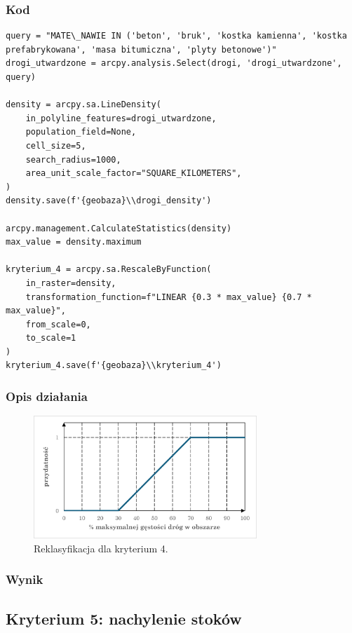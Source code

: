 \documentclass{article}
\begin{document}
\subsubsection{Kod}
\begin{lstlisting}
query = "MATE\_NAWIE IN ('beton', 'bruk', 'kostka kamienna', 'kostka prefabrykowana', 'masa bitumiczna', 'plyty betonowe')"
drogi_utwardzone = arcpy.analysis.Select(drogi, 'drogi_utwardzone', query)

density = arcpy.sa.LineDensity(
    in_polyline_features=drogi_utwardzone,
    population_field=None,
    cell_size=5,
    search_radius=1000,
    area_unit_scale_factor="SQUARE_KILOMETERS",
)
density.save(f'{geobaza}\\drogi_density')

arcpy.management.CalculateStatistics(density)
max_value = density.maximum

kryterium_4 = arcpy.sa.RescaleByFunction(
    in_raster=density,
    transformation_function=f"LINEAR {0.3 * max_value} {0.7 * max_value}",
    from_scale=0,
    to_scale=1   
)
kryterium_4.save(f'{geobaza}\\kryterium_4')
\end{lstlisting}

\subsubsection{Opis działania}
\begin{figure}[H]
    \centering
    \includegraphics[width=0.75\textwidth]{img/kryterium4-wykres-glowny.png}
    \caption*{Reklasyfikacja dla kryterium 4.}
\end{figure}

\subsubsection{Wynik}
\newpage
\subsection{Kryterium 5: nachylenie stoków}
\end{document}
